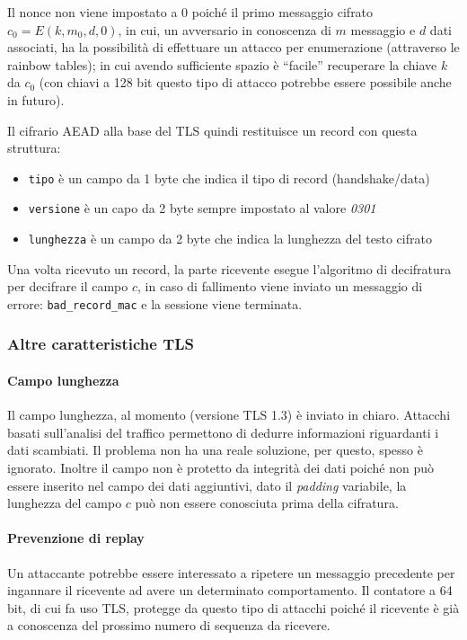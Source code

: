 Il nonce non viene impostato a 0 poiché il primo messaggio cifrato $c_0 = E(k,m_0,d,0)$, in cui, un avversario in conoscenza di $m$ messaggio e $d$ dati associati, ha la possibilità di effettuare un attacco per enumerazione (attraverso le rainbow tables); in cui avendo sufficiente spazio è ``facile'' recuperare la chiave $k$ da $c_0$ (con chiavi a 128 bit questo tipo di attacco potrebbe essere possibile anche in futuro).

\vspace{1em}
Il cifrario AEAD alla base del TLS quindi restituisce un record con questa struttura:



\begin{itemize}
    \item \texttt{tipo} è un campo da 1 byte che indica il tipo di record (handshake/data)
    \item \texttt{versione} è un capo da 2 byte sempre impostato al valore \textit{0301}
    \item \texttt{lunghezza} è un campo da 2 byte che indica la lunghezza del testo cifrato
\end{itemize}

Una volta ricevuto un record, la parte ricevente esegue l'algoritmo di decifratura per decifrare il campo $c$, in caso di fallimento viene inviato un messaggio di errore: \texttt{bad\_record\_mac} e la sessione viene terminata.

\subsubsection{Altre caratteristiche TLS}
\paragraph{Campo lunghezza}
Il campo lunghezza, al momento (versione TLS 1.3) è inviato in chiaro. Attacchi basati sull'analisi del traffico permettono di dedurre informazioni riguardanti i dati scambiati. Il problema non ha una reale soluzione, per questo, spesso è ignorato. Inoltre il campo non è protetto da integrità dei dati poiché non può essere inserito nel campo dei dati aggiuntivi, dato il \emph{padding} variabile, la lunghezza del campo $c$ può non essere conosciuta prima della cifratura.

\paragraph{Prevenzione di replay}
Un attaccante potrebbe essere interessato a ripetere un messaggio precedente per ingannare il ricevente ad avere un determinato comportamento. Il contatore a 64 bit, di cui fa uso TLS, protegge da questo tipo di attacchi poiché il ricevente è già a conoscenza del prossimo numero di sequenza da ricevere.


